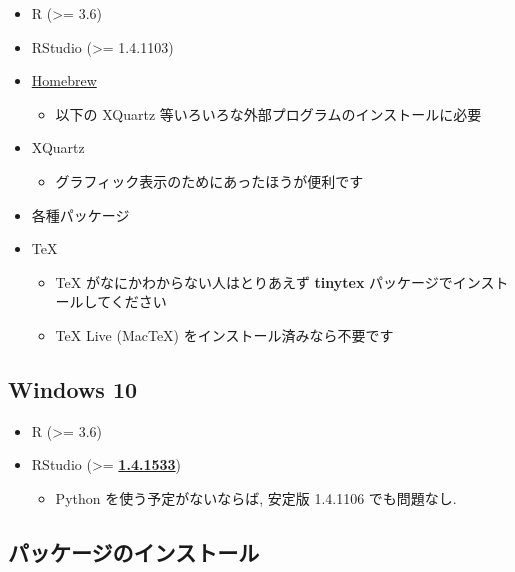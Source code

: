 \documentclass[
]{bxjsarticle}
\providecommand{\tightlist}{%
  \setlength{\itemsep}{0pt}\setlength{\parskip}{0pt}}
\begin{document}
\begin{itemize}
\tightlist
\item
  R (\textgreater= 3.6)
\item
  RStudio (\textgreater= 1.4.1103)
\item
  \href{https://brew.sh/index_ja}{Homebrew}

  \begin{itemize}
  \tightlist
  \item
    以下の XQuartz 等いろいろな外部プログラムのインストールに必要
  \end{itemize}
\item
  XQuartz

  \begin{itemize}
  \tightlist
  \item
    グラフィック表示のためにあったほうが便利です
  \end{itemize}
\item
  各種パッケージ
\item
  TeX

  \begin{itemize}
  \tightlist
  \item
    TeX がなにかわからない人はとりあえず \textbf{tinytex} パッケージでインストールしてください
  \item
    TeX Live (MacTeX) をインストール済みなら不要です
  \end{itemize}
\end{itemize}

\hypertarget{windows-10}{%
\subsection{Windows 10}\label{windows-10}}

\begin{itemize}
\tightlist
\item
  R (\textgreater= 3.6)
\item
  RStudio (\textgreater= \href{https://dailies.rstudio.com/rstudio/oss/windows/}{\textbf{1.4.1533}})

  \begin{itemize}
  \tightlist
  \item
    Python を使う予定がないならば, 安定版 1.4.1106 でも問題なし.
  \end{itemize}
\end{itemize}

\hypertarget{ux30d1ux30c3ux30b1ux30fcux30b8ux306eux30a4ux30f3ux30b9ux30c8ux30fcux30eb}{%
\subsection{パッケージのインストール}\label{ux30d1ux30c3ux30b1ux30fcux30b8ux306eux30a4ux30f3ux30b9ux30c8ux30fcux30eb}}
\end{document}
